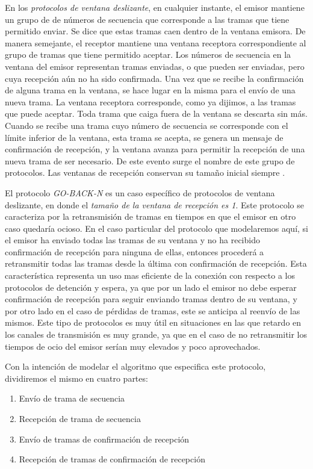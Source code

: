 \documentclass[pdftex,a4paper,12pt]{book}
\begin{document}
En los \textit{protocolos de ventana deslizante}, en cualquier instante, el emisor mantiene un grupo de de n\'umeros de secuencia que corresponde a las tramas que tiene permitido enviar. Se dice que estas tramas caen dentro de la ventana emisora. De manera semejante, el receptor mantiene una ventana receptora correspondiente al grupo de tramas que tiene permitido aceptar. Los n\'umeros de secuencia en la ventana del emisor representan tramas enviadas, o que pueden ser enviadas, pero cuya recepci\'on a\'un no ha sido confirmada. Una vez que se recibe la confirmaci\'on de alguna trama en la ventana, se hace lugar en la misma para el env\'io de una nueva trama. La ventana receptora corresponde, como ya dijimos, a las tramas que puede aceptar. Toda trama que caiga fuera de la ventana se descarta sin m\'as. Cuando se recibe una trama cuyo n\'umero de secuencia se corresponde con el l\'imite inferior de la ventana, esta trama se acepta, se genera un mensaje de confirmaci\'on de recepci\'on, y la ventana avanza para permitir la recepci\'on de una nueva trama de ser necesario. De este evento surge el nombre de este grupo de protocolos. Las ventanas de recepci\'on conservan su tama\~no inicial siempre \cite{tanembaum}.

El protocolo \textit{GO-BACK-N} es un caso espec\'ifico de protocolos de ventana deslizante, en donde el \textit{tama\~no de la ventana de recepci\'on es 1}. Este protocolo se caracteriza por la retransmisi\'on de tramas en tiempos en que el emisor en otro caso quedar\'ia ocioso. En el caso particular del protocolo que modelaremos aqu\'i, si el emisor ha enviado todas las tramas de su ventana y no ha recibido confirmaci\'on de recepci\'on para ninguna de ellas, entonces proceder\'a a retransmitir todas las tramas desde la \'ultima con confirmaci\'on de recepci\'on. Esta caracter\'istica representa un uso mas eficiente de la conexi\'on con respecto a los protocolos de detenci\'on y espera, ya que por un lado el emisor no debe esperar confirmaci\'on de recepci\'on para seguir enviando tramas dentro de su ventana, y por otro lado en el caso de p\'erdidas de tramas, este se anticipa al reenv\'io de las mismos. Este tipo de protocolos es muy \'util en situaciones en las que retardo en los canales de transmisi\'on es muy grande, ya que en el caso de no retransmitir los tiempos de ocio del emisor ser\'ian muy elevados y poco aprovechados.

Con la intenci\'on de modelar el algoritmo que especifica este protocolo, dividiremos el mismo en cuatro partes:
\begin{enumerate}
\item Env\'io de trama de secuencia
\item Recepci\'on de trama de secuencia
\item Env\'io de tramas de confirmaci\'on de recepci\'on
\item Recepci\'on de tramas de confirmaci\'on de recepci\'on
\end{enumerate}
\end{document}
